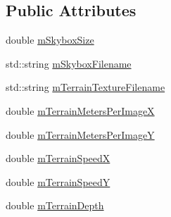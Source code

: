 \subsection*{Public Attributes}
\begin{DoxyCompactItemize}
\item 
double \hyperlink{class_ambience_render_data_a619be04e63ef41deac443cabba9c8d2f}{m\-Skybox\-Size}
\item 
std\-::string \hyperlink{class_ambience_render_data_a462dce5cb2e535c15a0fbf94d99220e3}{m\-Skybox\-Filename}
\item 
std\-::string \hyperlink{class_ambience_render_data_a642bc5ab8f0db9224f7b00b9d6c58beb}{m\-Terrain\-Texture\-Filename}
\item 
double \hyperlink{class_ambience_render_data_a05eaae9de570dab5a7bce2454b257945}{m\-Terrain\-Meters\-Per\-Image\-X}
\item 
double \hyperlink{class_ambience_render_data_a0ad3dba20cdff18a2de47a305399c72e}{m\-Terrain\-Meters\-Per\-Image\-Y}
\item 
double \hyperlink{class_ambience_render_data_ab897015a20e658f3a8cf9c4b87bcb442}{m\-Terrain\-Speed\-X}
\item 
double \hyperlink{class_ambience_render_data_a09b0e2e8506ffe824a2ffec40471e827}{m\-Terrain\-Speed\-Y}
\item 
double \hyperlink{class_ambience_render_data_a18b979f952900e973802f2d4cca82b13}{m\-Terrain\-Depth}
\end{DoxyCompactItemize}


